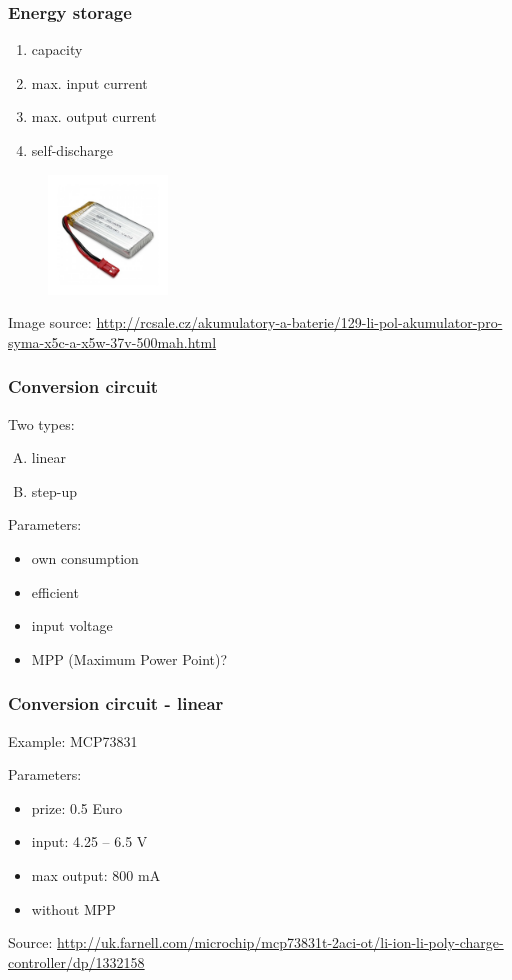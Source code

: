 \documentclass[12;pt,t]{beamer} %
\newcommand{\srctext}[1]{{\fontsize{7}{9}\selectfont\textcolor{sourcesclr}{#1}}}
\begin{document}
\begin{frame}
    \frametitle{Energy storage}
    \begin{center}
		\begin{enumerate}
			\item capacity
            \item max. input current 
            \item max. output current 
            \item self-discharge
		\end{enumerate}
    \end{center}
    
    \begin{figure}[H]
        \includegraphics[width=120px]{img/li-pol-akumulator-pro-dron-sky-boot-700mah-37v.jpg}
   	\end{figure}
    \srctext{Image source: \url{http://rcsale.cz/akumulatory-a-baterie/129-li-pol-akumulator-pro-syma-x5c-a-x5w-37v-500mah.html}}
\end{frame}


\begin{frame}
    \frametitle{Conversion circuit}
    Two types:
    	\begin{enumerate}[A)]
			\item linear
            \item step-up
    	\end{enumerate}
   
   \vspace{5mm}
   Parameters:
 	\begin{itemize}
		\item own consumption
        \item efficient
        \item input voltage
        \item MPP (Maximum Power Point)?
   	\end{itemize}

\end{frame}

\begin{frame}
    \frametitle{Conversion circuit - linear}
    Example: MCP73831
   
   \vspace{5mm}
   Parameters:
 	\begin{itemize}
		\item prize: 0.5 Euro
        \item input: 4.25 – 6.5 V
        \item max output: 800 mA
        \item without MPP
   	\end{itemize}
    \srctext{Source: \url{http://uk.farnell.com/microchip/mcp73831t-2aci-ot/li-ion-li-poly-charge-controller/dp/1332158}}
\end{frame}
\end{document}
